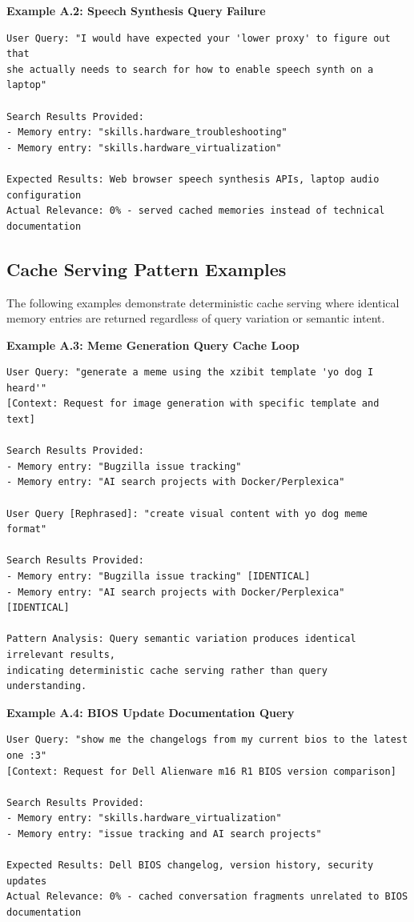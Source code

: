 \documentclass[12pt]{article}
\begin{document}
\textbf{Example A.2: Speech Synthesis Query Failure}

\begin{verbatim}
User Query: "I would have expected your 'lower proxy' to figure out that 
she actually needs to search for how to enable speech synth on a laptop"

Search Results Provided:
- Memory entry: "skills.hardware_troubleshooting"
- Memory entry: "skills.hardware_virtualization"

Expected Results: Web browser speech synthesis APIs, laptop audio configuration
Actual Relevance: 0% - served cached memories instead of technical documentation
\end{verbatim}

\subsection{Cache Serving Pattern Examples}

The following examples demonstrate deterministic cache serving where identical memory entries are returned regardless of query variation or semantic intent.

\textbf{Example A.3: Meme Generation Query Cache Loop}

\begin{verbatim}
User Query: "generate a meme using the xzibit template 'yo dog I heard'"
[Context: Request for image generation with specific template and text]

Search Results Provided:
- Memory entry: "Bugzilla issue tracking"
- Memory entry: "AI search projects with Docker/Perplexica"

User Query [Rephrased]: "create visual content with yo dog meme format"

Search Results Provided:
- Memory entry: "Bugzilla issue tracking" [IDENTICAL]
- Memory entry: "AI search projects with Docker/Perplexica" [IDENTICAL]

Pattern Analysis: Query semantic variation produces identical irrelevant results, 
indicating deterministic cache serving rather than query understanding.
\end{verbatim}

\textbf{Example A.4: BIOS Update Documentation Query}

\begin{verbatim}
User Query: "show me the changelogs from my current bios to the latest one :3"
[Context: Request for Dell Alienware m16 R1 BIOS version comparison]

Search Results Provided:
- Memory entry: "skills.hardware_virtualization"
- Memory entry: "issue tracking and AI search projects"

Expected Results: Dell BIOS changelog, version history, security updates
Actual Relevance: 0% - cached conversation fragments unrelated to BIOS documentation
\end{verbatim}
\end{document}
